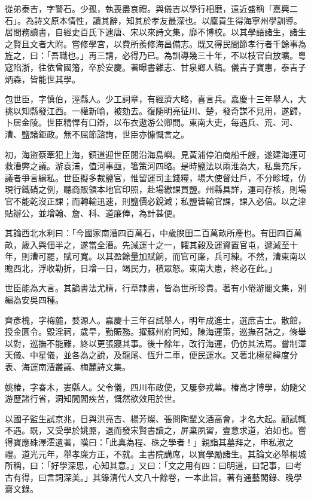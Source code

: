 \begin{pinyinscope}
從弟泰吉，字警石。少孤，執喪盡哀禮。與儀吉以學行相磨，遠近盛稱「嘉興二石」。為詩文原本情性，讀其辭，知其於孝友最深也。以廩貢生得海寧州學訓導。居間務讀書，自經史百氏下逮唐、宋以來詩文集，靡不博校。以其學語諸生，諸生之賢且文者大附。嘗修學宮，以費所羨修海昌備志。既又得民間節孝行者千餘事為旌之，曰：「吾職也。」再三請，必得乃已。為訓導幾三十年，不以枝官自放曠。粵寇陷浙，往依曾國籓，卒於安慶。著曝書雜志、甘泉鄉人稿。儀吉子寶惠，泰吉子炳森，皆能世其學。

包世臣，字慎伯，涇縣人。少工詞章，有經濟大略，喜言兵。嘉慶十三年舉人，大挑以知縣發江西。一權新喻，被劾去。復隨明亮征川、楚，發奇謀不見用，遂歸，卜居金陵。世臣精悍有口辯，以布衣遨游公卿間。東南大吏，每遇兵、荒、河、漕、鹽諸鉅政。無不屈節諮詢，世臣亦慷慨言之。

初，海盜蔡牽犯上海，鎮道迎世臣閱沿海島嶼。見黃浦停泊商船千艘，遂建海運可救漕弊之議。游袁浦，值河事亟，箸策河四略。是時鹽法以兩淮為大，私梟充斥，議者爭言緝私。世臣擬多裁鹽官，惟留運司主錢糧，場大使督灶戶，不分畛域，仿現行鐵硝之例，聽商販領本地官印照，赴場繳課買鹽。州縣具詳，運司存核，則場官不能乾沒正課；而轉輸迅速，則鹽價必銳減；私鹽皆輸官課，課入必倍。以之津貼辦公，並增翰、詹、科、道廉俸，為計甚便。

其論西北水利曰：「今國家南漕四百萬石，中歲腴田二百萬畝所產也。有田四百萬畝，歲入與佃半之，遂當全漕。先減運十之一，糶其穀及運資置官屯，遞減至十年，則漕可罷，賦可寬。以其盈餘量加賦餉，而官可廉，兵可練。不然，漕東南以贍西北，浮收勒折，日增一日，竭民力，積眾怒。東南大患，終必在此。」

世臣能為大言。其論書法尤精，行草隸書，皆為世所珍貴。著有小倦游閣文集，別編為安吳四種。

齊彥槐，字梅麓，婺源人。嘉慶十三年召試舉人，明年成進士，選庶吉士。散館，授金匱令。毀淫祠，歲旱，勤賑務。擢蘇州府同知，陳海運策，巡撫召詰之，條舉以對，巡撫不能難，終以更張寢其事。後十餘年，改行海運，仍仿其法焉。嘗制渾天儀、中星儀，並各為之說，及龍尾、恆升二車，便民運水。又著北極星緯度分表、海運南漕叢議、梅麓詩文集。

姚椿，字春木，婁縣人。父令儀，四川布政使，又屢參戎幕。椿高才博學，幼隨父游歷諸行省，洞知閭閻疾苦，慨然欲效用於世。

以國子監生試京兆，日與洪亮吉、楊芳燦、張問陶輩文酒高會，才名大起。顧試輒不遇。既，又受學於姚鼐，退而發宋賢書讀之，屏棄夙習，壹意求道，泊如也。嘗得寶應硃澤澐遺著，嘆曰：「此真為程、硃之學者！」親詣其墓拜之，申私淑之禮。道光元年，舉孝廉方正，不就。主書院講席，以實學勵諸生。其論文必舉桐城所稱，曰：「好學深思，心知其意。」又曰：「文之用有四：曰明道，曰記事，曰考古有得，曰言詞深美。」其錄清代人文八十餘卷，一本此旨。著有通藝閣錄、晚學齋文錄。


\end{pinyinscope}
